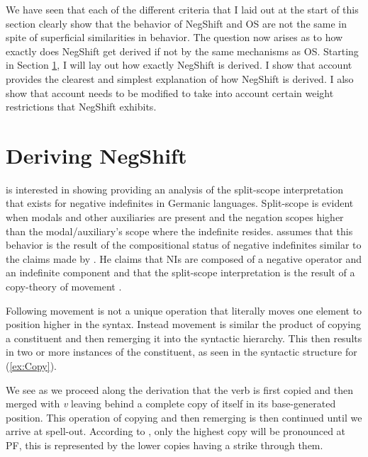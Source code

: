 \documentclass[12pt, letterpaper]{article}
\begin{document}
We have seen that each of the different criteria that I laid out at the start of this section clearly show that the behavior of NegShift and OS are not the same in spite of superficial similarities in behavior. The question now arises as to how exactly does NegShift get derived if not by the same mechanisms as OS. Starting in Section \ref{sec:DERIVING}, I will lay out how exactly NegShift is derived. I show that  account provides the clearest and simplest explanation of how NegShift is derived. I also show that  account needs to be modified to take into account certain weight restrictions that NegShift exhibits.

\section{Deriving NegShift} \label{sec:DERIVING}

\citet{zeijlstraSyntacticallyComplexStatus2011} is interested in showing providing an analysis of the split-scope interpretation that exists for negative indefinites in Germanic languages. Split-scope is evident when modals and other auxiliaries are present and the negation scopes higher than the modal/auxiliary's scope where the indefinite resides. \citeauthor{zeijlstraSyntacticallyComplexStatus2011} assumes that this behavior is the result of the compositional status of negative indefinites similar to the claims made by \citet{iatridouNegativeDPsAMovement2011}. He claims that NIs are composed of a negative operator and an indefinite component and that the split-scope interpretation is the result of a copy-theory of movement \citep{chomskyMinimalistProgram2015}. 

Following \citeauthor{chomskyMinimalistProgram2015} movement is not a unique operation that literally moves one element to position higher in the syntax. Instead movement is similar the product of copying a constituent and then remerging it into the syntactic hierarchy. This then results in two or more instances of the constituent, as seen in the syntactic structure for (\ref{ex:Copy}). 

We see as we proceed along the derivation that the verb is first copied and then merged with \emph{v} leaving behind a complete copy of itself in its base-generated position. This operation of copying and then remerging is then continued until we arrive at spell-out. According to \citet{chomskyMinimalistProgram2015}, only the highest copy will be pronounced at PF, this is represented by the lower copies having a strike through them. 
\end{document}
